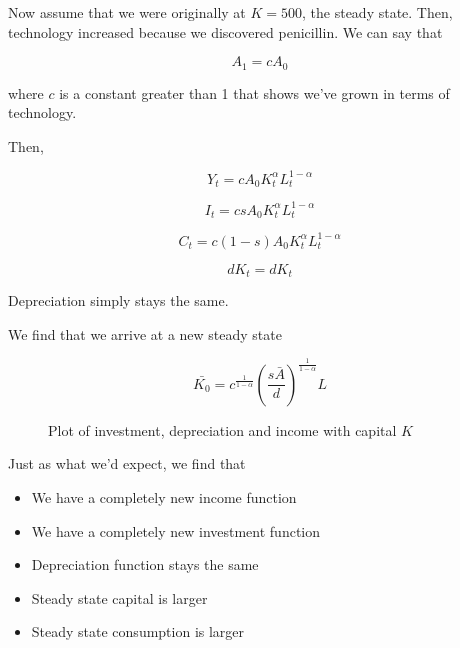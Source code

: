 \documentclass[11pt]{scrartcl}
\newcommand{\oneth}{\ensuremath{\alpha}}
\newcommand{\twoth}{\ensuremath{1-\alpha}}
\begin{document}
Now assume that we were originally at $K = 500$, the steady state. Then, technology increased because we discovered penicillin. We can say that

\[A_1 = cA_0\] 

where $c$ is a constant greater than 1 that shows we've grown in terms of technology.

Then,

\[Y_t = cA_0K_t^\oneth L_t^\twoth \]

\[I_t = csA_0K_t^\oneth L_t^\twoth\]

\[C_t =  c(1-s)A_0K_t^\oneth L_t^\twoth\]

\[dK_t = dK_t\] 

Depreciation simply stays the same. 

We find that we arrive at a new steady state

\[\bar{K_0} = c^{\frac{1}{1-\alpha}}\left(\frac{s\bar{A}}{d}\right)^{\frac{1}{1-\alpha}}L \]

\begin{figure}[H]
\centering
{}
\caption{Plot of investment, depreciation and income with capital $K$}
\end{figure}

Just as what we'd expect, we find that

\begin{itemize}
\item We have a completely new income function
\item We have a completely new investment function
\item Depreciation function stays the same
\item Steady state capital is larger
\item Steady state consumption is larger
\end{itemize}
\end{document}
